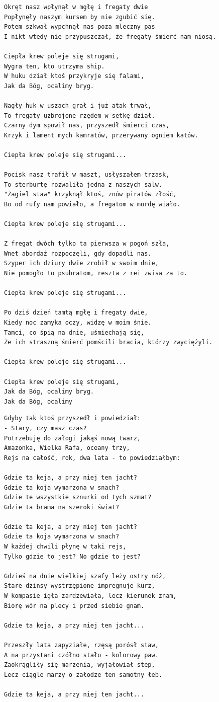 \documentclass[12pt]{article}
\begin{document}
\begin{verbatim}
Okręt nasz wpłynął w mgłę i fregaty dwie
Popłynęły naszym kursem by nie zgubić się.
Potem szkwał wypchnął nas poza mleczny pas
I nikt wtedy nie przypuszczał, że fregaty śmierć nam niosą.

Ciepła krew poleje się strugami,
Wygra ten, kto utrzyma ship.
W huku dział ktoś przykryje się falami,
Jak da Bóg, ocalimy bryg.

Nagły huk w uszach grał i już atak trwał,
To fregaty uzbrojone rzędem w setkę dział.
Czarny dym spowił nas, przyszedł śmierci czas,
Krzyk i lament mych kamratów, przerywany ogniem katów.

Ciepła krew poleje się strugami...

Pocisk nasz trafił w maszt, usłyszałem trzask,
To sterburtę rozwaliła jedna z naszych salw.
"Żagiel staw" krzyknął ktoś, znów piratów złość,
Bo od rufy nam powiało, a fregatom w mordę wiało.

Ciepła krew poleje się strugami...

Z fregat dwóch tylko ta pierwsza w pogoń szła,
Wnet abordaż rozpoczęli, gdy dopadli nas.
Szyper ich dziury dwie zrobił w swoim dnie,
Nie pomogło to psubratom, reszta z rei zwisa za to.

Ciepła krew poleje się strugami...

Po dziś dzień tamtą mgłę i fregaty dwie,
Kiedy noc zamyka oczy, widzę w moim śnie.
Tamci, co śpią na dnie, uśmiechają się,
Że ich straszną śmierć pomścili bracia, którzy zwyciężyli.

Ciepła krew poleje się strugami...

Ciepła krew poleje się strugami,
Jak da Bóg, ocalimy bryg.
Jak da Bóg, ocalimy
\end{verbatim}
\clearpage

\begin{verbatim}
Gdyby tak ktoś przyszedł i powiedział:
- Stary, czy masz czas?
Potrzebuję do załogi jakąś nową twarz,
Amazonka, Wielka Rafa, oceany trzy,
Rejs na całość, rok, dwa lata - to powiedziałbym:

Gdzie ta keja, a przy niej ten jacht?
Gdzie ta koja wymarzona w snach?
Gdzie te wszystkie sznurki od tych szmat?
Gdzie ta brama na szeroki świat?

Gdzie ta keja, a przy niej ten jacht?
Gdzie ta koja wymarzona w snach?
W każdej chwili płynę w taki rejs,
Tylko gdzie to jest? No gdzie to jest?

Gdzieś na dnie wielkiej szafy leży ostry nóż,
Stare dżinsy wystrzępione impregnuje kurz,
W kompasie igła zardzewiała, lecz kierunek znam,
Biorę wór na plecy i przed siebie gnam.

Gdzie ta keja, a przy niej ten jacht...

Przeszły lata zapyziałe, rzęsą porósł staw,
A na przystani czółno stało - kolorowy paw.
Zaokrągliły się marzenia, wyjałowiał step,
Lecz ciągle marzy o załodze ten samotny łeb.

Gdzie ta keja, a przy niej ten jacht...
\end{verbatim}
\clearpage
\end{document}
